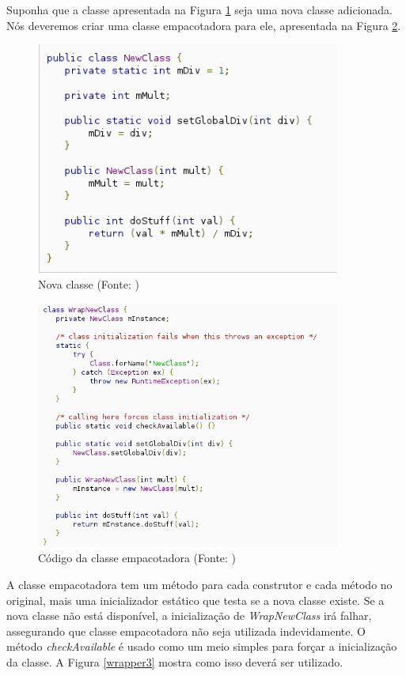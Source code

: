 Suponha que a classe apresentada na Figura \ref{wrapper1} seja uma nova classe adicionada.
Nós deveremos criar uma classe empacotadora para ele, apresentada na Figura \ref{wrapper2}.

\begin{figure}[h]
    \centering
    \includegraphics[width=10cm]{img/wrapper1}
    \caption[Código da nova classe]{Nova classe (Fonte: \cite{back_compat})}
    \label{wrapper1}
\end{figure}

\begin{figure}[h]
    \centering
    \includegraphics[width=10cm]{img/wrapper2}
    \caption[Código da classe empacotadora]{Código da classe empacotadora (Fonte: \cite{back_compat})}
    \label{wrapper2}
\end{figure}

A classe empacotadora tem um método para cada construtor e cada método no original,
mais uma inicializador estático que testa se a nova classe existe. Se a nova classe
não está disponível, a inicialização de {\it WrapNewClass} irá falhar, assegurando
que classe empacotadora não seja utilizada indevidamente. O método {\it checkAvailable} 
é usado como um meio simples para forçar a inicialização da classe. A Figura \ref{wrapper3}
mostra como isso deverá ser utilizado.

